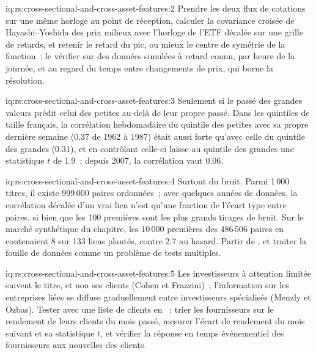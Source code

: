 \begin{solution}{iq:rs:cross-sectional-and-cross-asset-features:2}
Prendre les deux flux de cotations sur une même horloge au point de réception, calculer la covariance croisée de Hayashi--Yoshida des prix milieux avec l'horloge de l'ETF
décalée sur une grille de retards, et retenir le retard du pic, ou mieux le centre de symétrie de la fonction~; le vérifier sur
des données simulées à retard connu, par heure de la journée, et au regard du temps entre changements de prix, qui borne la résolution.
\end{solution}

\begin{solution}{iq:rs:cross-sectional-and-cross-asset-features:3}
Seulement si le passé des grandes valeurs prédit celui des petites au-delà de leur propre passé. Dans les quintiles de taille français, la corrélation hebdomadaire
du quintile des petites avec sa propre dernière semaine (0.37 de 1962 à 1987) était aussi forte qu'avec celle du quintile des grandes (0.31), et en contrôlant celle-ci
laisse au quintile des grandes une statistique $t$ de 1.9~; depuis 2007, la corrélation vaut 0.06.
\end{solution}

\begin{solution}{iq:rs:cross-sectional-and-cross-asset-features:4}
Surtout du bruit. Parmi 1\,000 titres, il existe 999\,000 paires ordonnées~; avec quelques années de données, la corrélation décalée d'un vrai lien n'est qu'une
fraction de l'écart type entre paires, si bien que les 100 premières sont les plus grands tirages de bruit. Sur le marché synthétique du chapitre, les
10\,000 premières des 486\,506 paires en contenaient 8 sur 133 liens plantés, contre 2.7 au hasard. Partir de , et traiter la fouille
de données comme un problème de tests multiples.
\end{solution}

\begin{solution}{iq:rs:cross-sectional-and-cross-asset-features:5}
Les investisseurs à attention limitée suivent le titre, et non ses clients (Cohen et Frazzini)~; l'information sur les entreprises liées se diffuse
graduellement entre investisseurs spécialisés (Menzly et Ozbas). Tester avec une liste de clients en ~: trier les fournisseurs sur le rendement de leurs clients
du mois passé, mesurer l'écart de rendement du mois suivant et sa statistique $t$, et vérifier la réponse en temps événementiel des fournisseurs
aux nouvelles des clients.
\end{solution}

